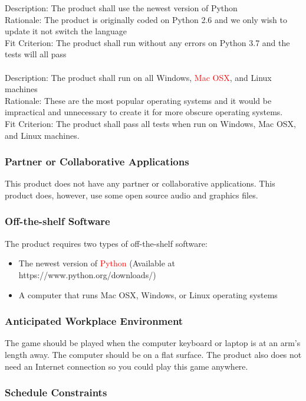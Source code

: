 \documentclass[12pt, titlepage]{article}
\begin{document}
Description: The product shall use the newest version of Python\\
Rationale: The product is originally coded on Python 2.6 and we only wish to update it not switch the language\\
Fit Criterion: The product shall run without any errors on Python 3.7 and the tests will all pass \\ \\
Description: The product shall run on all Windows, \textcolor{red}{Mac OSX}, and Linux machines\\
Rationale: These are the most popular operating systems and it would be impractical and unnecessary to create it for more obscure operating systems.\\
Fit Criterion: The product shall pass all tests when run on Windows, Mac OSX, and Linux machines.

\subsubsection{Partner or Collaborative Applications}

This product does not have any partner or collaborative applications. This product does, however, use some open source audio and graphics files.

\subsubsection{Off-the-shelf Software}

The product requires two types of off-the-shelf software:
\begin{itemize}
\item The newest version of \textcolor{red}{Python} (Available at https://www.python.org/downloads/)
\item A computer that runs Mac OSX, Windows, or Linux operating systems
\end{itemize}

\subsubsection{Anticipated Workplace Environment}

The game should be played when the computer keyboard or laptop is at an arm's length away. The computer should be on a flat surface. The product also does not need an Internet connection so you could play this game anywhere. 

\subsubsection{Schedule Constraints}
\end{document}
